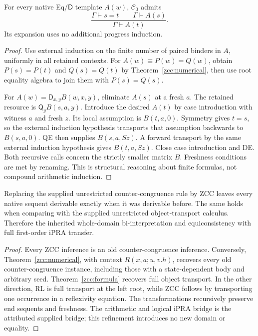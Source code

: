 \begin{theorem}\label{zcc:formula}
For every native Eq/$\mathsf D$ template $A(w)$, $\mathcal C_0$ admits
\[
 \frac{\Gamma\vdash s=t\qquad\Gamma\vdash A(s)}
      {\Gamma\vdash A(t)}.
\]
Its expansion uses no additional progress induction.
\end{theorem}
\begin{proof}
Use external induction on the finite number of paired binders in $A$,
uniformly in all retained contexts. For $A(w)\equiv P(w)=Q(w)$, obtain
$P(s)=P(t)$ and $Q(s)=Q(t)$ by Theorem~\ref{zcc:numerical}, then use
root equality algebra to join them with $P(s)=Q(s)$.

For $A(w)=\mathsf D_{x,y}B(w,x,y)$, eliminate $A(s)$ at a fresh $a$.
The retained resource is $\mathsf Q_yB(s,a,y)$. Introduce the desired
$A(t)$ by case introduction with witness $a$ and fresh $z$. Its local
assumption is $B(t,a,0)$. Symmetry gives $t=s$, so the external induction
hypothesis transports that assumption backwards to $B(s,a,0)$.
QE then supplies $B(s,a,Sz)$. A forward transport by the same external
induction hypothesis gives $B(t,a,Sz)$. Close case introduction and DE.
Both recursive calls concern the strictly smaller matrix $B$. Freshness
conditions are met by renaming. This is structural reasoning about
finite formulas, not compound arithmetic induction.
\end{proof}

\begin{corollary}\label{zcc:equivalence}
Replacing the supplied unrestricted counter-congruence rule by ZCC leaves
every native sequent derivable exactly when it was derivable before.
The same holds when comparing with the supplied unrestricted
object-transport calculus. Therefore the inherited whole-domain
bi-interpretation and equiconsistency with full first-order iPRA transfer.
\end{corollary}
\begin{proof}
Every ZCC inference is an old counter-congruence inference. Conversely,
Theorem~\ref{zcc:numerical}, with context $R(x,a;u,v.h)$, recovers every
old counter-congruence instance, including those with a state-dependent
body and arbitrary seed. Theorem~\ref{zcc:formula} recovers full object
transport. In the other direction, RL is full transport at the left
root, while ZCC follows by transporting one occurrence in a reflexivity
equation. The transformations recursively preserve end sequents and
freshness. The arithmetic and logical iPRA bridge is the attributed
supplied bridge; this refinement introduces no new domain or equality.
\end{proof}

